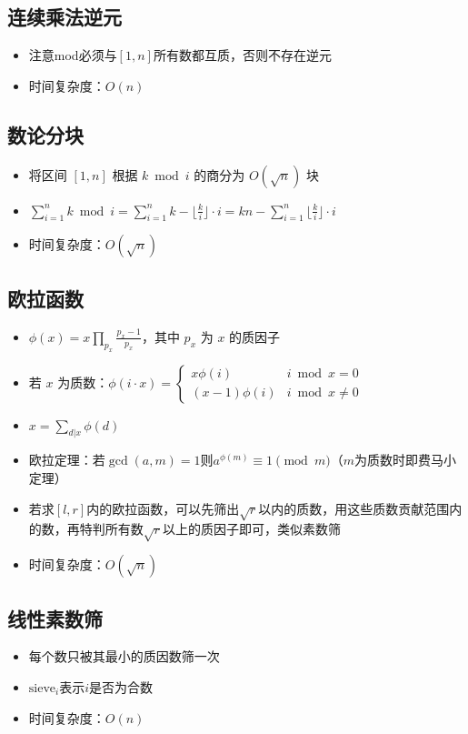 \documentclass[twocolumn,a4,8pt]{article}  %
\begin{document}
	 	\subsection{连续乘法逆元}
	 		\noindent\begin{itemize}
		 		\item 注意mod必须与$[1,n]$所有数都互质，否则不存在逆元
		 		\item 时间复杂度：$O(n)$
	 		\end{itemize}
	 	 	
	
	 	\subsection{数论分块}
	 		\noindent\begin{itemize}
	 			\item 将区间 $[1,n]$ 根据 $k\bmod i$ 的商分为 $O(\sqrt{n})$ 块
		 		\item $\sum_{i=1}^n k\bmod i=\sum_{i=1}^n k-\lfloor\frac{k}{i}\rfloor\cdot i=kn-\sum_{i=1}^n \lfloor\frac{k}{i}\rfloor\cdot i$
		 		\item 时间复杂度：$O(\sqrt{n})$
	 		\end{itemize}
	 	 	
	
	 	\subsection{欧拉函数}
	 		\noindent\begin{itemize}
		 		\item $\phi(x)=x\prod_{p_x}\frac{p_x-1}{p_x}$，其中 $p_x$ 为 $x$ 的质因子
		 		\item 若 $x$ 为质数：$\phi(i\cdot x)=\begin{cases}x\phi(i) & i\bmod x=0\\(x-1)\phi(i) & i\bmod x\neq 0\end{cases}$
		 		\item $x=\sum_{d|x}\phi(d)$
		 		\item 欧拉定理：若$\gcd(a,m)=1$则$a^{\phi(m)}\equiv 1\pmod m$（$m$为质数时即费马小定理）
		 		\item 若求$[l,r]$内的欧拉函数，可以先筛出$\sqrt{r}$以内的质数，用这些质数贡献范围内的数，再特判所有数$\sqrt{r}$以上的质因子即可，类似素数筛
		 		\item 时间复杂度：$O(\sqrt{n})$
	 		\end{itemize}
	 	 	
	
	 	\subsection{线性素数筛}
	 		\noindent\begin{itemize}
	 			\item 每个数只被其最小的质因数筛一次
		 		\item $\text{sieve}_i$表示$i$是否为合数
		 		\item 时间复杂度：$O(n)$
	 		\end{itemize}
	 	 	
\end{document}
